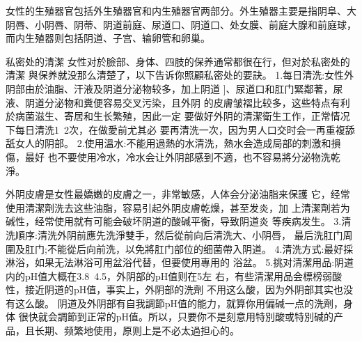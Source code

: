 \documentclass[12pt,UTF8]{ctexbook}
\begin{document}
女性的生殖器官包括外生殖器官和内生殖器官两部分。外生殖器主要是指阴阜、大阴唇、小阴唇、阴蒂、阴道前庭、尿道口、阴道口、处女膜、前庭大腺和前庭球，而内生殖器则包括阴道、子宫、输卵管和卵巢。

私密处的清潔
女性对於臉部、身体、四肢的保养通常都很在行，但对於私密处的清潔
與保养就没那么清楚了，以下告诉你照顧私密处的要訣。
1.每日清洗:女性外阴部由於油脂、汗液及阴道分泌物较多，加上阴道
]、尿道口和肛门緊鄰著，尿液、阴道分泌物和糞便容易交叉污染，且外阴
的皮膚皱褶比较多，这些特点有利於病菌滋生、寄居和生长繁殖，因此一定
要做好外阴的清潔衛生工作，正常情况下每日清洗1~2次，在做愛前尤其必
要再清洗一次，因为男人口交时会一再重複舔舐女人的阴部。
2.使用溫水:不能用過熱的水清洗，熱水会造成局部的刺激和損傷，最好
也不要使用冷水，冷水会让外阴部感到不適，也不容易將分泌物洗乾淨。

外阴皮膚是女性最嬌嫩的皮膚之一，非常敏感，人体会分泌油脂来保護
它，经常使用清潔劑洗去这些油脂，容易引起外阴皮膚乾燥，甚至发炎，加
上清潔劑若为碱性，经常使用就有可能会破坏阴道的酸碱平衡，导致阴道炎
等疾病发生。
3.清洗順序:清洗外阴前應先洗淨雙手，然后從前向后清洗大、小阴唇，
最后洗肛门周圍及肛门;不能從后向前洗，以免將肛门部位的细菌帶入阴道。
4.清洗方式:最好採淋浴，如果无法淋浴可用盆浴代替，但要使用專用的
浴盆。
5.挑对清潔用品:阴道内的pH值大概在3.8~4.5，外阴部的pH值则在5左
右，有些清潔用品会標榜弱酸性，接近阴道的pH值，事实上，外阴部的洗劑
不用这么酸，因为外阴部其实也没有这么酸。
阴道及外阴部有自我調節pH值的能力，就算你用偏碱一点的洗劑，身体
很快就会調節到正常的pH值。所以，只要你不是刻意用特別酸或特別碱的产
品，且长期、频繁地使用，原则上是不必太過担心的。
\end{document}
